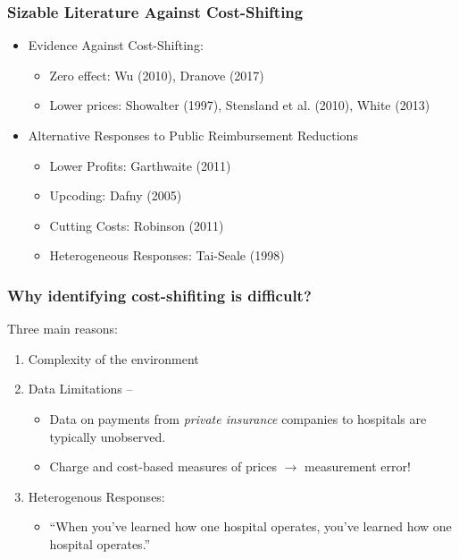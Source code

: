 \documentclass[ucs,9pt]{beamer}
\begin{document}
\begin{frame}
\frametitle{Sizable Literature Against Cost-Shifting}
\begin{itemize}
\item Evidence Against Cost-Shifting: 
\begin{itemize}
\item Zero effect: Wu (2010), Dranove (2017)
\item Lower prices: Showalter (1997), Stensland et al. (2010), White (2013)
\end{itemize}
\item Alternative Responses to Public Reimbursement Reductions
\begin{itemize}
\item Lower Profits: Garthwaite (2011)
\item Upcoding:  Dafny (2005)
\item Cutting Costs: Robinson (2011)
\item Heterogeneous Responses: Tai-Seale (1998)
\end{itemize}
\end{itemize}

\end{frame}

\begin{frame}
\frametitle{Why identifying cost-shifiting is difficult?}
Three main reasons:
\begin{enumerate}
\item Complexity of the environment
\item Data Limitations -- 
\begin{itemize}
\item Data on payments from \textit{private insurance} companies to hospitals are typically unobserved.
\item Charge and cost-based measures of prices $\rightarrow$ measurement error!
\end{itemize}   
\item Heterogenous Responses:
\begin{itemize}
\item ``When you've learned how one hospital operates, you've learned how one hospital operates.''
\end{itemize}
\end{enumerate}


\end{frame}
\end{document}

